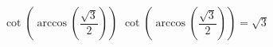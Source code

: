  {$\cot\left(\arccos\left(\dfrac{\sqrt{3}}{2}\right)\right)$}
{ $\cot\left(\arccos\left(\dfrac{\sqrt{3}}{2}\right)\right) = \sqrt{3}$}
